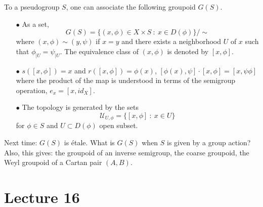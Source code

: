 To a pseudogroup $S$, one can associate the following groupoid $G(S)$.
\begin{itemize}
\item[$\bullet$] As a set, \[G(S) = \{(x,\phi)\in X\times S \ : \ x\in D(\phi)\} / \sim\]
where $(x,\phi)\sim (y,\psi)$ if $x=y$ and there exists a neighborhood $U$ of $x$ such that $\phi_{|U}=\psi_{|U}$. The equivalence class of $(x,\phi)$ is denoted by $[x,\phi]$.
\item[$\bullet$] $s([x,\phi]) = x$ and $r([x,\phi]) = \phi(x)$, $[\phi(x),\psi]\cdot [x,\phi] = [x, \psi\phi]$ where the product of the map is understood in terms of the semigroup operation, $e_x = [x,id_X]$.
\item[$\bullet$] The topology is generated by the sets
\[\mathcal U_{U, \phi} = \{[x,\phi] \ : \ x\in U \}\]
for $\phi\in S$ and $U\subset D(\phi)$ open subset.
\end{itemize} 

Next time: $G(S)$ is \'etale. What is $G(S)$ when $S$ is given by a group action? Also, this gives: the groupoid of an inverse semigroup, the coarse groupoid, the Weyl groupoid of a Cartan pair $(A,B)$.

\section{Lecture 16}

